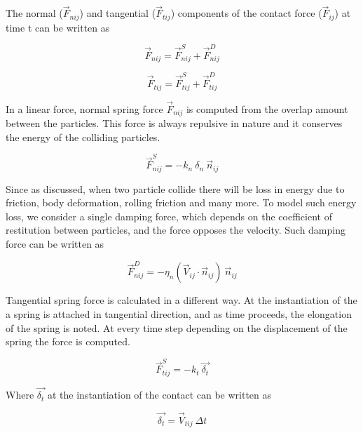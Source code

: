 The normal ($\vec{F}_{nij}$) and tangential ($\vec{F}_{tij}$)
components of the contact force ($\vec{F}_{ij}$) at time t can be
written as

\begin{equation}
  \label{eq:normal_force}
  \vec{F}_{nij} =  \vec{F}_{nij}^S +  \vec{F}_{nij}^D
\end{equation}

\begin{equation}
  \label{eq:tangential_force}
  \vec{F}_{tij} =  \vec{F}_{tij}^S +  \vec{F}_{tij}^D
\end{equation}

In a linear force, normal spring force $\vec{F}_{nij}$ is computed from the overlap
amount between the particles. This force is always repulsive in nature
and it conserves the energy of the colliding particles.

\begin{equation}
  \label{eq:normal_spring_force}
  \vec{F}_{nij}^S = -k_n \> \delta_n \> \vec{n}_{ij}
\end{equation}

Since as discussed, when two particle collide there will be loss in
energy due to friction, body deformation, rolling friction and many
more. To model such energy loss, we consider a single damping force,
which depends on the coefficient of restitution between particles, and
the force opposes the velocity. Such damping force can be written as

\begin{equation}
  \label{eq:normal_damping_force}
  \vec{F}_{nij}^D = -\eta_n  (\vec{V}_{ij} \cdot \vec{n}_{ij}) \> \vec{n}_{ij}
\end{equation}


Tangential spring force is calculated in a different way. At the
instantiation of the a spring is attached in tangential direction, and
as time proceeds, the elongation of the spring is noted. At every time
step depending on the displacement of the spring the force is
computed.

\begin{equation}
  \label{eq:tang_spring_force}
  \vec{F}_{tij}^S = -k_t \> \vec{\delta_t}
\end{equation}

Where $ \vec{\delta_t} $ at the instantiation of the contact
can be written as

\begin{equation}
  \label{eq:tang_disp}
 \vec{\delta_t} = \vec{V}_{tij} \> \Delta t
\end{equation}

